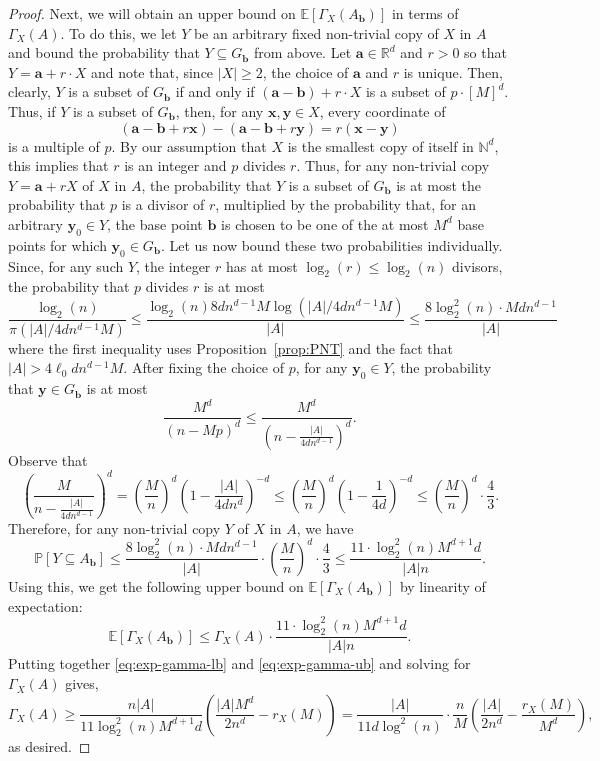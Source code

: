 \documentclass[12pt]{article}
\numberwithin{equation}{section}
\newcommand{\N}{\mathbb{N}}
\theoremstyle{definition}
\theoremstyle{remark}
\renewcommand{\vec}{\boldsymbol}
\begin{document}
\begin{proof}
Next, we will obtain an upper bound on $\mathbb{E}[\Gamma_X(A_{\vec{b}})]$ in terms of $\Gamma_X(A)$. To do this, we let $Y$ be an arbitrary fixed non-trivial copy of $X$ in $A$ and bound the probability that $Y\subseteq G_{\vec{b}}$ from above. Let $\vec{a}\in \mathbb{R}^d$ and $r>0$ so that $Y=\vec{a}+r\cdot X$ and note that, since $|X|\geq2$, the choice of $\vec{a}$ and $r$ is unique. Then, clearly, $Y$ is a subset of $G_{\vec{b}}$ if and only if $(\vec{a}-\vec{b})+r\cdot X$ is a subset of $p\cdot [M]^d$. Thus, if $Y$ is a subset of $G_{\vec{b}}$, then, for any $\vec{x},\vec{y}\in X$, every coordinate of 
\[(\vec{a}-\vec{b}+r\vec{x}) -(\vec{a}-\vec{b}+r\vec{y}) = r(\vec{x}-\vec{y})\]
is a multiple of $p$. By our assumption that $X$ is the smallest copy of itself in $\N^d$, this implies that $r$ is an integer and $p$ divides $r$. Thus, for any non-trivial copy $Y=\vec{a}+rX$ of $X$ in $A$, the probability that $Y$ is a subset of $G_{\vec{b}}$ is at most the probability that $p$ is a divisor of $r$, multiplied by the probability that, for an arbitrary $\vec{y}_0\in Y$, the base point $\vec{b}$ is chosen to be one of the at most $M^d$ base points for which $\vec{y}_0\in G_{\vec{b}}$. Let us now bound these two probabilities individually. Since, for any such $Y$, the integer $r$ has at most $\log_2(r)\leq \log_2(n)$ divisors, the probability that $p$ divides $r$ is at most
\[\frac{\log_2(n)}{\pi(|A|/4dn^{d-1}M)}\leq \frac{\log_2(n)8dn^{d-1}M\log(|A|/4dn^{d-1}M)}{|A|}\leq \frac{8\log^2_2(n)\cdot Mdn^{d-1}}{|A|}\]
where the first inequality uses Proposition~\ref{prop:PNT} and the fact that $|A|>4\ell_0dn^{d-1}M$. After fixing the choice of $p$, for any $\vec{y}_0\in Y$, the probability that $\vec{y}\in G_{\vec{b}}$ is at most
\[\frac{M^d}{(n-Mp)^d}\leq \frac{M^d}{\left(n-\frac{|A|}{4dn^{d-1}}\right)^d}.\]
Observe that
\[\left(\frac{M}{n- \frac{|A|}{4dn^{d-1}}}\right)^d = \left(\frac{M}{n}\right)^d\left({1 - \frac{|A|}{4dn^d}}\right)^{-d} \leq \left(\frac{M}{n}\right)^d\left(1 - \frac{1}{4d}\right)^{-d} \leq \left(\frac{M}{n}\right)^d\cdot\frac{4}{3}. \]
Therefore, for any non-trivial copy $Y$ of $X$ in $A$, we have
\[\mathbb{P}[Y\subseteq A_{\vec{b}}] \leq  \frac{8\log_2^2(n) \cdot Mdn^{d-1}}{|A|}\cdot \left(\frac{M}{n}\right)^d\cdot\frac{4}{3} \leq \frac{11\cdot\log_2^2(n)M^{d+1}d}{|A|n}. \]
Using this, we get the following upper bound on $\mathbb{E}[\Gamma_X(A_{\vec{b}})]$ by linearity of expectation:
\begin{equation}\label{eq:exp-gamma-ub}
\mathbb{E}[\Gamma_X(A_{\vec{b}})] \leq \Gamma_X(A) \cdot\frac{11\cdot\log_2^2(n)M^{d+1}d}{|A|n}. 
\end{equation}
Putting together \eqref{eq:exp-gamma-lb} and \eqref{eq:exp-gamma-ub} and solving for $\Gamma_X(A)$ gives,
\[\Gamma_X(A) \geq \frac{n |A|}{11\log_2^2(n)M^{d+1}d}\left(\frac{|A| M^d}{2n^d} - r_X (M)\right)= \frac{|A|}{11d\log^2(n)}\cdot \frac{n}{M}\left(\frac{|A|}{2n^d} - \frac{r_X (M)}{M^d}\right),\]
as desired.
\end{proof}
\end{document}
